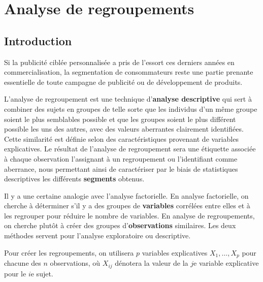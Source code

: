 \documentclass[
  11pt,
  letterpaper,
]{scrbook}
\theoremstyle{definition}
\theoremstyle{remark}
\begin{document}

\chapter{Analyse de regroupements}\label{analyse-regroupements}

\section{Introduction}\label{introduction-4}

Si la publicité ciblée personnalisée a pris de l'essort ces derniers
années en commercialisation, la segmentation de consommateurs reste une
partie prenante essentielle de toute campagne de publicité ou de
développement de produits.

L'analyse de regroupement est une technique d'\textbf{analyse
descriptive} qui sert à combiner des sujets en groupes de telle sorte
que les individus d'un même groupe soient le plus semblables possible et
que les groupes soient le plus différent possible les uns des autres,
avec des valeurs aberrantes clairement identifiées. Cette similarité est
définie selon des caractéristiques provenant de variables explicatives.
Le résultat de l'analyse de regroupement sera une étiquette associée à
chaque observation l'assignant à un regroupement ou l'identifiant comme
aberrance, nous permettant ainsi de caractériser par le biais de
statistiques descriptives les différents \textbf{segments} obtenus.

Il y a une certaine analogie avec l'analyse factorielle. En analyse
factorielle, on cherche à déterminer s'il y a des groupes de
\textbf{variables} corrélées entre elles et à les regrouper pour réduire
le nombre de variables. En analyse de regroupements, on cherche plutôt à
créer des groupes d'\textbf{observations} similaires. Les deux méthodes
servent pour l'analyse exploratoire ou descriptive.

Pour créer les regroupements, on utilisera \(p\) variables explicatives
\(X_1, \ldots, X_p\) pour chacune des \(n\) observations, où \(X_{ij}\)
dénotera la valeur de la \(j\)e variable explicative pour le \(i\)e
sujet.
\end{document}
